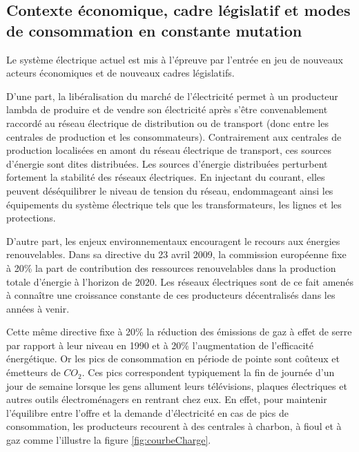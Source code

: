 \subsection{Contexte économique, cadre législatif et modes de con\-sommation en 
constante mutation}

Le système électrique actuel est mis à l'épreuve par l'entrée en jeu de nouveaux acteurs économiques et de nouveaux cadres législatifs. 

D'une part, la libéralisation du marché de l'électricité permet à un producteur lambda de produire et de vendre son électricité après s'être convenablement raccordé au réseau électrique de distribution ou de transport (donc entre les centrales de production et les consommateurs). Contrairement aux centrales de production localisées en amont du réseau électrique de transport, ces sources d'énergie sont dites distribuées. Les sources d'énergie distribuées perturbent fortement la stabilité des réseaux électriques. En injectant du courant, elles peuvent déséquilibrer le niveau de tension du réseau, endommageant ainsi les équipements du système électrique tels que les transformateurs, les lignes et les protections. 

D'autre part, les enjeux environnementaux encouragent le recours aux énergies renouvelables. Dans sa directive du 23 avril 2009, la commission européenne fixe à 20\% la part de contribution des ressources renouvelables dans la production totale d'énergie à l'horizon de 2020. Les réseaux électriques sont de ce fait amenés à connaître une croissance constante de ces producteurs décentralisés dans les années à venir.

Cette même directive fixe à 20\% la réduction des émissions de gaz à effet de serre par rapport à leur niveau en 1990 et à 20\% l'augmentation de l'efficacité énergétique. Or les pics de consommation en période de pointe sont coûteux et émetteurs de $CO_{2}$. Ces pics correspondent typiquement la fin de journée d'un jour de semaine lorsque les gens allument leurs télévisions, plaques électriques et autres outils électroménagers en rentrant chez eux.  En effet, pour maintenir l'équilibre entre l'offre et la demande d'électricité en cas de pics de consommation, les producteurs recourent à des centrales à charbon, à fioul et à gaz comme l'illustre la figure \ref{fig:courbeCharge}.


